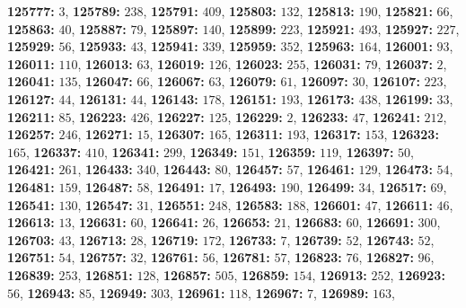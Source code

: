 \textsf{\bfseries 125777:} $3$, \textsf{\bfseries 125789:} $238$, \textsf{\bfseries 125791:} $409$, \textsf{\bfseries 125803:} $132$, \textsf{\bfseries 125813:} $190$, \textsf{\bfseries 125821:} $66$, \textsf{\bfseries 125863:} $40$, \textsf{\bfseries 125887:} $79$, \textsf{\bfseries 125897:} $140$, \textsf{\bfseries 125899:} $223$, \textsf{\bfseries 125921:} $493$, \textsf{\bfseries 125927:} $227$, \textsf{\bfseries 125929:} $56$, \textsf{\bfseries 125933:} $43$, \textsf{\bfseries 125941:} $339$, \textsf{\bfseries 125959:} $352$, \textsf{\bfseries 125963:} $164$, \textsf{\bfseries 126001:} $93$, \textsf{\bfseries 126011:} $110$, \textsf{\bfseries 126013:} $63$, \textsf{\bfseries 126019:} $126$, \textsf{\bfseries 126023:} $255$, \textsf{\bfseries 126031:} $79$, \textsf{\bfseries 126037:} $2$, \textsf{\bfseries 126041:} $135$, \textsf{\bfseries 126047:} $66$, \textsf{\bfseries 126067:} $63$, \textsf{\bfseries 126079:} $61$, \textsf{\bfseries 126097:} $30$, \textsf{\bfseries 126107:} $223$, \textsf{\bfseries 126127:} $44$, \textsf{\bfseries 126131:} $44$, \textsf{\bfseries 126143:} $178$, \textsf{\bfseries 126151:} $193$, \textsf{\bfseries 126173:} $438$, \textsf{\bfseries 126199:} $33$, \textsf{\bfseries 126211:} $85$, \textsf{\bfseries 126223:} $426$, \textsf{\bfseries 126227:} $125$, \textsf{\bfseries 126229:} $2$, \textsf{\bfseries 126233:} $47$, \textsf{\bfseries 126241:} $212$, \textsf{\bfseries 126257:} $246$, \textsf{\bfseries 126271:} $15$, \textsf{\bfseries 126307:} $165$, \textsf{\bfseries 126311:} $193$, \textsf{\bfseries 126317:} $153$, \textsf{\bfseries 126323:} $165$, \textsf{\bfseries 126337:} $410$, \textsf{\bfseries 126341:} $299$, \textsf{\bfseries 126349:} $151$, \textsf{\bfseries 126359:} $119$, \textsf{\bfseries 126397:} $50$, \textsf{\bfseries 126421:} $261$, \textsf{\bfseries 126433:} $340$, \textsf{\bfseries 126443:} $80$, \textsf{\bfseries 126457:} $57$, \textsf{\bfseries 126461:} $129$, \textsf{\bfseries 126473:} $54$, \textsf{\bfseries 126481:} $159$, \textsf{\bfseries 126487:} $58$, \textsf{\bfseries 126491:} $17$, \textsf{\bfseries 126493:} $190$, \textsf{\bfseries 126499:} $34$, \textsf{\bfseries 126517:} $69$, \textsf{\bfseries 126541:} $130$, \textsf{\bfseries 126547:} $31$, \textsf{\bfseries 126551:} $248$, \textsf{\bfseries 126583:} $188$, \textsf{\bfseries 126601:} $47$, \textsf{\bfseries 126611:} $46$, \textsf{\bfseries 126613:} $13$, \textsf{\bfseries 126631:} $60$, \textsf{\bfseries 126641:} $26$, \textsf{\bfseries 126653:} $21$, \textsf{\bfseries 126683:} $60$, \textsf{\bfseries 126691:} $300$, \textsf{\bfseries 126703:} $43$, \textsf{\bfseries 126713:} $28$, \textsf{\bfseries 126719:} $172$, \textsf{\bfseries 126733:} $7$, \textsf{\bfseries 126739:} $52$, \textsf{\bfseries 126743:} $52$, \textsf{\bfseries 126751:} $54$, \textsf{\bfseries 126757:} $32$, \textsf{\bfseries 126761:} $56$, \textsf{\bfseries 126781:} $57$, \textsf{\bfseries 126823:} $76$, \textsf{\bfseries 126827:} $96$, \textsf{\bfseries 126839:} $253$, \textsf{\bfseries 126851:} $128$, \textsf{\bfseries 126857:} $505$, \textsf{\bfseries 126859:} $154$, \textsf{\bfseries 126913:} $252$, \textsf{\bfseries 126923:} $56$, \textsf{\bfseries 126943:} $85$, \textsf{\bfseries 126949:} $303$, \textsf{\bfseries 126961:} $118$, \textsf{\bfseries 126967:} $7$, \textsf{\bfseries 126989:} $163$, 
